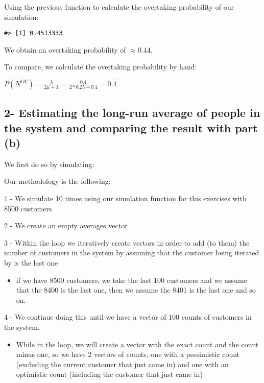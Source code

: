 \documentclass[]{article}
\providecommand{\tightlist}{%
  \setlength{\itemsep}{0pt}\setlength{\parskip}{0pt}}
\begin{document}
Using the previous function to calculate the overtaking probability of
our simulation:

\begin{verbatim}
#> [1] 0.4513333
\end{verbatim}

We obtain an overtaking probability of \(\approx 0.44\).

To compare, we calculate the overtaking probability by hand:

\(P(N^{OV}) = \frac{\lambda}{2 \mu + \lambda} = \frac{0.4}{2 * 0.25 + 0.4} = 0. \bar{4}\)

\newpage

\hypertarget{estimating-the-long-run-average-of-people-in-the-system-and-comparing-the-result-with-part-b}{%
\subsection{2- Estimating the long-run average of people in the system
and comparing the result with part
(b)}\label{estimating-the-long-run-average-of-people-in-the-system-and-comparing-the-result-with-part-b}}

We first do so by simulating:

Our methodology is the following:

1 - We simulate 10 times using our simulation function for this
exercises with 8500 customers

2 - We create an empty averages vector

3 - Within the loop we iteratively create vectors in order to add (to
them) the number of customers in the system by assuming that the
customer being iterated by is the last one

\begin{itemize}
\tightlist
\item
  if we have 8500 customers, we take the last 100 customers and we
  assume that the 8400 is the last one, then we assume the 8401 is the
  last one and so on.
\end{itemize}

4 - We continue doing this until we have a vector of 100 counts of
customers in the system.

\begin{itemize}
\tightlist
\item
  While in the loop, we will create a vector with the exact count and
  the count minus one, so we have 2 vectors of counts, one with a
  pessimistic count (excluding the current customer that just came in)
  and one with an optimistic count (including the customer that just
  came in)
\end{itemize}
\end{document}
